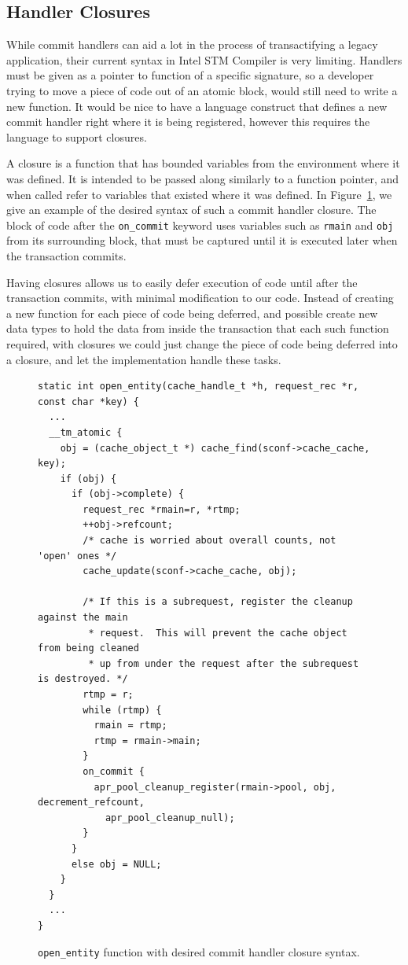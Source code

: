 \documentclass[preprint,11pt]{sigplanconf}
\begin{document}
\subsection{Handler Closures}
While commit handlers can aid a lot in the process of transactifying a legacy
application, their current syntax in Intel STM Compiler is very limiting.
Handlers must be given as a pointer to function of a specific signature, so a
developer trying to move a piece of code out of an atomic block, would still
need to write a new function. It would be nice to have a language construct that
defines a new commit handler right where it is being registered, however this
requires the language to support closures. 

A closure is a function that has bounded variables from the environment where it
was defined. It is intended to be passed along similarly to a function pointer,
and when called refer to variables that existed where it was defined. In
Figure~\ref{code:closure-open-entity}, we give an example of the desired syntax
of such a commit handler closure. The block of code after the {\tt on_commit}
keyword uses variables such as {\tt rmain} and {\tt obj} from its surrounding
block, that must be captured until it is executed later when the transaction
commits.

Having closures allows us to easily defer execution of code until after the
transaction commits, with minimal modification to our code. Instead of creating
a new function for each piece of code being deferred, and possible create new
data types to hold the data from inside the transaction that each such function
required, with closures we could just change the piece of code being deferred
into a closure, and let the implementation handle these tasks.

\begin{figure}
\begin{lstlisting}
static int open_entity(cache_handle_t *h, request_rec *r, const char *key) {
  ...
  __tm_atomic {
    obj = (cache_object_t *) cache_find(sconf->cache_cache, key);
    if (obj) {
      if (obj->complete) {
        request_rec *rmain=r, *rtmp;
        ++obj->refcount;
        /* cache is worried about overall counts, not 'open' ones */
        cache_update(sconf->cache_cache, obj);

        /* If this is a subrequest, register the cleanup against the main
         * request.  This will prevent the cache object from being cleaned
         * up from under the request after the subrequest is destroyed. */
        rtmp = r;
        while (rtmp) {
          rmain = rtmp;
          rtmp = rmain->main;
        }
        on_commit {
          apr_pool_cleanup_register(rmain->pool, obj, decrement_refcount, 
            apr_pool_cleanup_null);
        }
      }
      else obj = NULL;
    }
  }
  ...
}
\end{lstlisting}
\caption{{\tt open\_entity} function with desired commit handler closure syntax.}
\label{code:closure-open-entity}
\end{figure}
\end{document}
